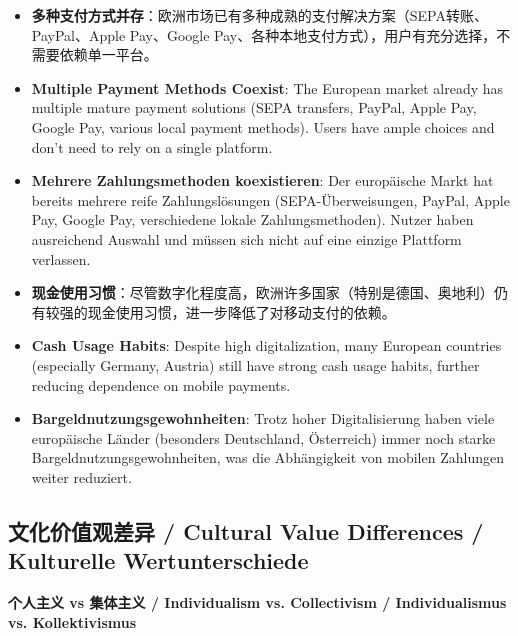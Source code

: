 \documentclass[11pt,a4paper]{article}
\begin{document}
\begin{itemize}
    
    \item \textbf{多种支付方式并存}：欧洲市场已有多种成熟的支付解决方案（SEPA转账、PayPal、Apple Pay、Google Pay、各种本地支付方式），用户有充分选择，不需要依赖单一平台。
    \item \textbf{Multiple Payment Methods Coexist}: The European market already has multiple mature payment solutions (SEPA transfers, PayPal, Apple Pay, Google Pay, various local payment methods). Users have ample choices and don't need to rely on a single platform.
    \item \textbf{Mehrere Zahlungsmethoden koexistieren}: Der europäische Markt hat bereits mehrere reife Zahlungslösungen (SEPA-Überweisungen, PayPal, Apple Pay, Google Pay, verschiedene lokale Zahlungsmethoden). Nutzer haben ausreichend Auswahl und müssen sich nicht auf eine einzige Plattform verlassen.
    
    \item \textbf{现金使用习惯}：尽管数字化程度高，欧洲许多国家（特别是德国、奥地利）仍有较强的现金使用习惯，进一步降低了对移动支付的依赖。
    \item \textbf{Cash Usage Habits}: Despite high digitalization, many European countries (especially Germany, Austria) still have strong cash usage habits, further reducing dependence on mobile payments.
    \item \textbf{Bargeldnutzungsgewohnheiten}: Trotz hoher Digitalisierung haben viele europäische Länder (besonders Deutschland, Österreich) immer noch starke Bargeldnutzungsgewohnheiten, was die Abhängigkeit von mobilen Zahlungen weiter reduziert.
\end{itemize}

\subsection{文化价值观差异 / Cultural Value Differences / Kulturelle Wertunterschiede}

\textbf{个人主义 vs 集体主义 / Individualism vs. Collectivism / Individualismus vs. Kollektivismus}
\end{document}
